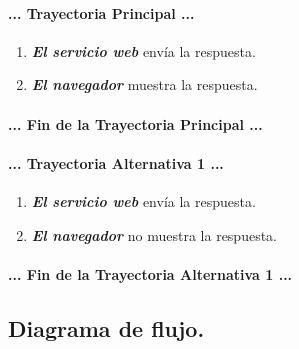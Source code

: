\documentclass[12pt, a4paper, titlepage]{report}
\begin{document}
    		\paragraph{... Trayectoria Principal ...}
    			\begin{enumerate}
    				\item \textbf{\textit{El servicio web}} envía la respuesta.
    				
    				\item \textbf{\textit{El navegador}} muestra la respuesta.
    			\end{enumerate}
    		\paragraph{... Fin de la Trayectoria Principal ...}
    		
    		\paragraph{... Trayectoria Alternativa 1 ...}
    			\begin{enumerate}
    				\item \textbf{\textit{El servicio web}} envía la respuesta.
    				
    				\item \textbf{\textit{El navegador}} no muestra la respuesta.
    			\end{enumerate}
    		\paragraph{... Fin de la Trayectoria Alternativa 1 ...}
			\newpage
	     
	     
            \subsection{Diagrama de flujo.}
            
\end{document}
